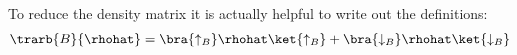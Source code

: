 To reduce the density matrix it is actually helpful to write out the definitions:
\begin{align}
\trarb{B}{\rhohat} = \bra{\uparrow_B}\rhohat\ket{\uparrow_B}+\bra{\downarrow_B}\rhohat\ket{\downarrow_B}
\end{align}